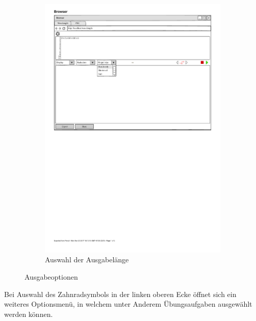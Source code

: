\documentclass[parskip=full,11pt,twoside]{scrartcl}
\begin{document}
\begin{figure}[H]
\begin{subfigure}[r]{0.25\textwidth}
		\includegraphics{img/outputSizeMenu}
	\caption{Auswahl der Ausgabelänge}	
	\end{subfigure}
	\caption{\label{fig:outputOptions} Ausgabeoptionen}
\end{figure}

Bei Auswahl des Zahnradsymbols in der linken oberen Ecke öffnet sich ein weiteres Optionsmenü, in welchem unter Anderem Übungsaufgaben ausgewählt werden können. 
\end{document}

